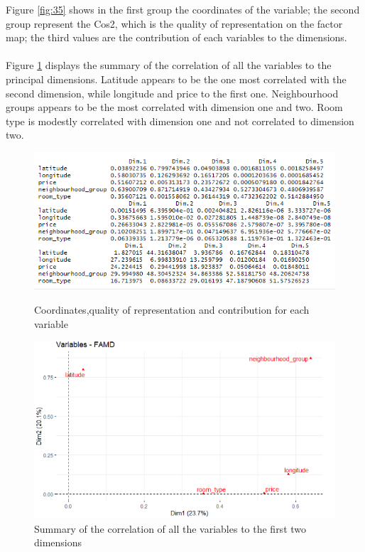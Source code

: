 \documentclass{FR16}
\begin{document}
\noindent Figure \ref{fig:35} shows in the first group the coordinates of the variable; the second group represent the Cos2, which is the quality of representation on the factor map; the third values are the contribution of each variables to the dimensions. 
\\\\
Figure \ref{fig:36} displays the summary of the correlation of all the variables to the principal dimensions.
Latitude appears to be the one most correlated with the second dimension, while longitude and price to the first one. Neighbourhood groups appears to be the most correlated with dimension one and two. Room type is modestly correlated with dimension one and not correlated to dimension two. 
\begin{figure}[!htb]
   \begin{minipage}{0.48\textwidth}
     \centering
    \includegraphics[width=1\textwidth]{figures/FAMD5.PNG} 
 \caption{\label{fig:35} Coordinates,quality of representation and contribution for each variable }
   \end{minipage}\hfill
   \begin{minipage}{0.48\textwidth}
     \centering
       \includegraphics[width=1\textwidth]{figures/FAMD6.PNG} 
 \caption{\label{fig:36} Summary of the correlation of all the variables to the first two dimensions }
   \end{minipage}
   
\end{figure}
\end{document}

